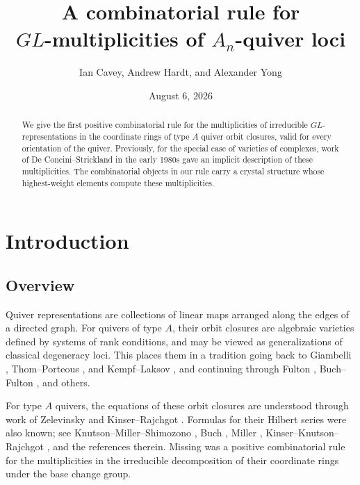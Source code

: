 \documentclass[12pt]{amsart}
\theoremstyle{definition}
\theoremstyle{remark}
\begin{document}
\pagestyle{plain}

\title{A combinatorial rule for\\ $GL$-multiplicities of $A_n$-quiver loci}
  
\author{Ian Cavey, Andrew Hardt, and Alexander Yong}

\address{Department of Mathematics, U.~Illinois Urbana-Champaign, Urbana, IL 61801, USA}
\date{August 6, 2026}

\begin{abstract}
We give the first positive combinatorial rule for the multiplicities of irreducible $GL$-representations
in the coordinate rings of type $A$ quiver orbit closures, valid for every orientation of the quiver.
Previously, for the special case of varieties of complexes, work of De Concini--Strickland in the early 1980s gave an implicit description of these multiplicities. The combinatorial objects in our rule carry a crystal structure whose highest-weight elements compute these multiplicities.
\end{abstract}

\maketitle
\section{Introduction}

\subsection{Overview}

Quiver representations are collections of linear maps arranged along the edges of a directed graph. 
For quivers of type $A$, their orbit closures are algebraic varieties defined by systems of rank conditions, and may be viewed as generalizations of classical degeneracy loci. This places them in a tradition going back to Giambelli \cite{FultonPragacz}, Thom--Porteous \cite{Porteous}, and Kempf--Laksov \cite{KempfLaksov}, and continuing through Fulton \cite{Fulton-duke}, Buch--Fulton \cite{BuchFulton}, and others.

For type $A$ quivers, the equations of these orbit closures are understood through work of Zelevinsky \cite{Zelevinsky} and Kinser--Rajchgot \cite{KinserRajchgot}. 
Formulas for their Hilbert series were also known;
see Knutson--Miller--Shimozono \cite{KMS}, Buch \cite{BuchJAMS}, Miller \cite{MillerDuke}, 
Kinser--Knutson--Rajchgot \cite{KKR}, and the references therein. 
Missing was a positive combinatorial rule for the multiplicities in the irreducible decomposition of their coordinate
rings under the base change group.
\end{document}
